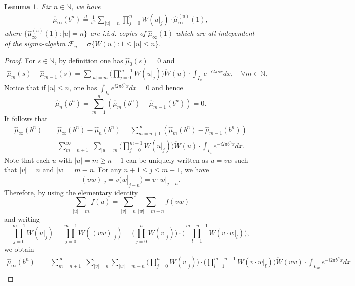 \documentclass[12pt]{amsart}
\newtheorem{lemma}[theorem]{Lemma}
\theoremstyle{definition}
\theoremstyle{remark}
\newcommand{\N}{\mathbb{N}}
\numberwithin{equation}{section}
\begin{document}
\begin{lemma}\label{lemma-eqn-function-equality}
Fix $n\in\N$, we have  
\begin{align}\label{eqn-function-equality} 
 \widehat{\mu}_{\infty}\left(b^n\right)\stackrel{d}{=}\frac{1}{b^n}\sum_{|u|=n}  \prod_{j=0}^{n} W(u|_j)  \cdot \widehat{\mu}_{\infty}^{(u)}(1),
\end{align}
where $\{\widehat{\mu}_{\infty}^{(u)}(1):|u|=n\}$ are i.i.d. copies of $\widehat{\mu}_{\infty}(1)$ which are all independent of the sigma-algebra $\mathscr{F}_{n}=\sigma\{W(u): 1\leq |u|\leq n\}$.
\end{lemma}
\begin{proof}
For  $s\in \N$,  by definition one has $\widehat{\mu}_0(s)=0$ and 
\begin{align}\label{eqn-m-differ-s}
\widehat{\mu}_{m}(s)-\widehat{\mu}_{m-1}(s)=\sum_{|u|=m}  \Big(\prod_{j=0}^{m-1} W(u|_j)\Big) \mathring{W}(u) \cdot \int_{I_u} e^{-i2\pi s x}dx , \quad \forall m \in \N,
\end{align}
Notice that if $|u|\leq n$, one has $ \int_{I_u} e^{i2\pi b^n x}dx=0$ and hence 
\[
\widehat{\mu}_{n}\left(b^n\right) =\sum_{m=1}^{n}\left(\widehat{\mu}_{m}\left(b^n\right)-\widehat{\mu}_{m-1}\left(b^n\right)\right) =0 .
\]
It follows that 
\begin{align*}
\widehat{\mu}_{\infty}\left(b^n\right) & =\widehat{\mu}_{\infty}\left(b^n\right)-\widehat{\mu}_{n}\left(b^n\right) 
 =\sum_{m=n+1}^{\infty}\left(\widehat{\mu}_{m}\left(b^n\right)-\widehat{\mu}_{m-1}\left(b^n\right)\right) \\
&=\sum_{m=n+1}^{\infty} \,\,\sum_{|u|=m} \Big(\prod_{j=0}^{m-1} W(u|_j)\Big) \mathring{W}(u) \cdot \int_{I_u} e^{-i 2 \pi b^n x} d x. 
\end{align*}
Note that each $u$ with $|u|=m\ge n+1$ can be uniquely written as  $u= vw$ such that  $|v|=n$ and $|w|=m-n$.  For any $n+1\le j \le m-1$, we have 
\[
(vw)|_j = v (w|_{j-n}) = v  \cdot w|_{j-n}. 
\]
Therefore, by using the elementary identity 
\[
\sum_{|u|=m}   f(u) =     \sum_{|v|=n} \sum_{|w|= m-n} f(vw)
\]
and writing  
\[
\prod_{j=0}^{m-1} W(u|_j)    = \prod_{j=0}^{m-1} W((vw)|_j)  = \Big(\prod_{j=0}^{n} W(v|_j)\Big) \cdot \Big(\prod_{l=1}^{m-n-1} W(v \cdot w|_l)\Big),
\]
we obtain 
\begin{align*}
\widehat{\mu}_{\infty}\left(b^n\right)  &= \sum_{m=n+1}^{\infty} \,\,\sum_{|v|=n} \sum_{|w|= m-n}    \Big(\prod_{j=0}^{n} W(v|_j)\Big) \cdot \Big(\prod_{l=1}^{m-n-1} W(v\cdot w|_l)\Big)      \mathring{W}(vw) \cdot \int_{I_{vw}} e^{-i 2 \pi b^n x} d x\\

\end{align*}
\end{proof}
\end{document}
